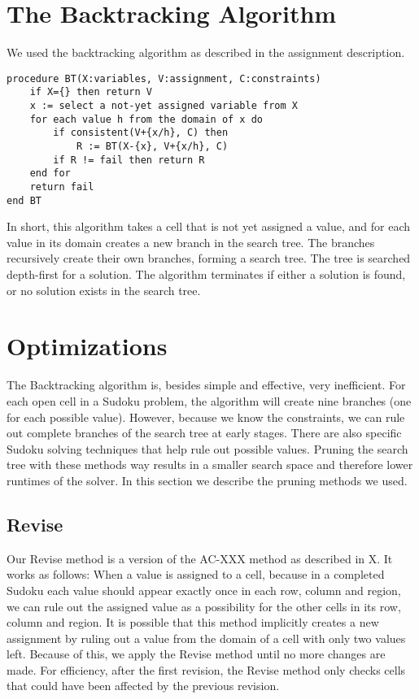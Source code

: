 \documentclass[11pt]{article} %
\begin{document}
\section{The Backtracking Algorithm}

We used the backtracking algorithm as described in the assignment description.

\begin{verbatim}
procedure BT(X:variables, V:assignment, C:constraints)
    if X={} then return V
    x := select a not-yet assigned variable from X
    for each value h from the domain of x do
        if consistent(V+{x/h}, C) then
            R := BT(X-{x}, V+{x/h}, C)
        if R != fail then return R
    end for
    return fail
end BT
\end{verbatim}

In short, this algorithm takes a cell that is not yet assigned a value, and for each value in its domain creates a new branch in the search tree. The branches recursively create their own branches, forming a search tree. The tree is searched depth-first for a solution. The algorithm terminates if either a solution is found, or no solution exists in the search tree.

\section{Optimizations}

The Backtracking algorithm is, besides simple and effective, very inefficient. For each open cell in a Sudoku problem, the algorithm will create nine branches (one for each possible value). However, because we know the constraints, we can rule out complete branches of the search tree at early stages. There are also specific Sudoku solving techniques that help rule out possible values. Pruning the search tree with these methods way results in a smaller search space and therefore lower runtimes of the solver. In this section we describe the pruning methods we used.

\subsection{Revise}

Our Revise method is a version of the AC-XXX method as described in X. It works as follows: When a value is assigned to a cell, because in a completed Sudoku each value should appear exactly once in each row, column and region, we can rule out the assigned value as a possibility for the other cells in its row, column and region. It is possible that this method implicitly creates a new assignment by ruling out a value from the domain of a cell with only two values left. Because of this, we apply the Revise method until no more changes are made. For efficiency, after the first revision, the Revise method only checks cells that could have been affected by the previous revision.
\end{document}
